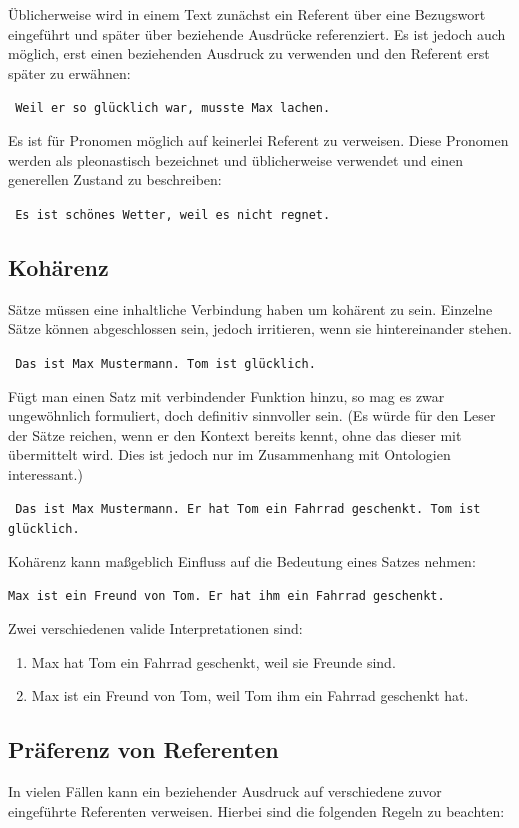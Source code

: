 \documentclass[12pt]{report}
\begin{document}
Üblicherweise wird in einem Text zunächst ein Referent über eine Bezugswort eingeführt und später über beziehende Ausdrücke referenziert. Es ist jedoch auch möglich, erst einen beziehenden Ausdruck zu verwenden und den Referent erst später zu erwähnen:

\tt
Weil er so glücklich war, musste Max lachen.
\rm

Es ist für Pronomen möglich auf keinerlei Referent zu verweisen. Diese Pronomen werden als pleonastisch bezeichnet und üblicherweise verwendet und einen generellen Zustand zu beschreiben:

\tt 
Es ist schönes Wetter, weil es nicht regnet.
\rm

\subsection{Kohärenz}
Sätze müssen eine inhaltliche Verbindung haben um kohärent zu sein. Einzelne Sätze können abgeschlossen sein, jedoch irritieren, wenn sie hintereinander stehen. 

\tt 
Das ist Max Mustermann. Tom ist glücklich.
\rm

Fügt man einen Satz mit verbindender Funktion hinzu, so mag es zwar ungewöhnlich formuliert, doch definitiv sinnvoller sein. (Es würde für den Leser der Sätze reichen, wenn er den Kontext bereits kennt, ohne das dieser mit übermittelt wird. Dies ist jedoch nur im Zusammenhang mit Ontologien interessant.)

\tt 
Das ist Max Mustermann. Er hat Tom ein Fahrrad geschenkt. Tom ist glücklich.
\rm

Kohärenz kann maßgeblich Einfluss auf die Bedeutung eines Satzes nehmen:

\tt Max ist ein Freund von Tom. Er hat ihm ein Fahrrad geschenkt. 

\rm

Zwei verschiedenen valide Interpretationen sind:

\begin{enumerate}
\item Max hat Tom ein Fahrrad geschenkt, weil sie Freunde sind.
\item Max ist ein Freund von Tom, weil Tom ihm ein Fahrrad geschenkt hat. 
\end{enumerate}

\subsection{Präferenz von Referenten}
In vielen Fällen kann ein beziehender Ausdruck auf verschiedene zuvor eingeführte Referenten verweisen. Hierbei sind die folgenden Regeln zu beachten:
\end{document}
